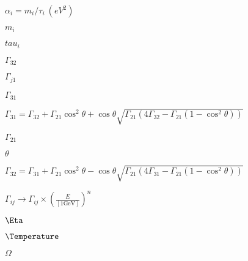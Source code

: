 \documentclass{article}
\begin{document}
$\alpha_i=m_i/\tau_i\ (eV^2)$
\pagebreak

$m_i$
\pagebreak

$tau_i$
\pagebreak

$\Gamma_{32}$
\pagebreak

$\Gamma_{j1}$
\pagebreak

$\Gamma_{31}$
\pagebreak

$
  \Gamma_{31} = \Gamma_{32} + \Gamma_{21} \cos^2\theta +
  \cos\theta \sqrt{\Gamma_{21} (4\Gamma_{32} - \Gamma_{21} (1 -
  \cos^2\theta))} $
\pagebreak

$\Gamma_{21}$
\pagebreak

$\theta$
\pagebreak

$
  \Gamma_{32} = \Gamma_{31} + \Gamma_{21} \cos^2\theta -
  \cos\theta \sqrt{\Gamma_{21} (4\Gamma_{31} - \Gamma_{21} (1 -
  \cos^2\theta))} $
\pagebreak

$
  \Gamma_{ij} \rightarrow \Gamma_{ij} \times \left(\frac{E}{[1
  \mbox{GeV}]}\right)^n $
\pagebreak

$\Eta$
\pagebreak

$\Temperature$
\pagebreak

$\Omega$
\pagebreak
\end{document}
